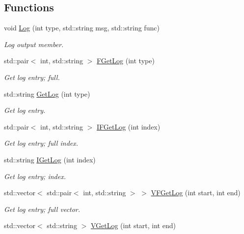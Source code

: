 \subsection*{Functions}
\begin{DoxyCompactItemize}
\item 
void \hyperlink{namespacepessum_a4d349f207308b877a48bb4907e15dc69}{Log} (int type, std\+::string msg, std\+::string func)
\begin{DoxyCompactList}\small\item\em Log output member. \end{DoxyCompactList}\item 
std\+::pair$<$ int, std\+::string $>$ \hyperlink{namespacepessum_ae7c3a2695cc96dc4f826e252d5dd4398}{F\+Get\+Log} (int type)
\begin{DoxyCompactList}\small\item\em Get log entry; full. \end{DoxyCompactList}\item 
std\+::string \hyperlink{namespacepessum_aa7ccd36394acb961bdd887f32b3572e1}{Get\+Log} (int type)
\begin{DoxyCompactList}\small\item\em Get log entry. \end{DoxyCompactList}\item 
std\+::pair$<$ int, std\+::string $>$ \hyperlink{namespacepessum_a92df65a763df879d6902d5c5c600f1d4}{I\+F\+Get\+Log} (int index)
\begin{DoxyCompactList}\small\item\em Get log entry; full index. \end{DoxyCompactList}\item 
std\+::string \hyperlink{namespacepessum_aeb38d643b26d768565f5a2c89b103f83}{I\+Get\+Log} (int index)
\begin{DoxyCompactList}\small\item\em Get log entry; index. \end{DoxyCompactList}\item 
std\+::vector$<$ std\+::pair$<$ int, std\+::string $>$ $>$ \hyperlink{namespacepessum_a32367e906bdf84c0942a5e4a3588b255}{V\+F\+Get\+Log} (int start, int end)
\begin{DoxyCompactList}\small\item\em Get log entry; full vector. \end{DoxyCompactList}\item 
std\+::vector$<$ std\+::string $>$ \hyperlink{namespacepessum_a82047101ac6c52e881b2817c487038ff}{V\+Get\+Log} (int start, int end)

\end{DoxyCompactItemize}
